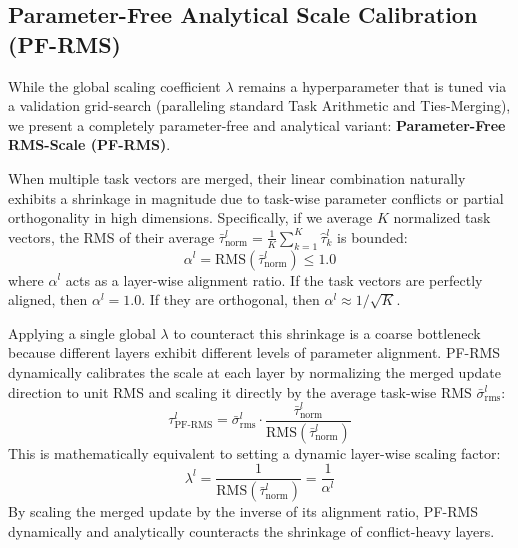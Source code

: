 \subsection{Parameter-Free Analytical Scale Calibration (PF-RMS)}
While the global scaling coefficient $\lambda$ remains a hyperparameter that is tuned via a validation grid-search (paralleling standard Task Arithmetic and Ties-Merging), we present a completely parameter-free and analytical variant: \textbf{Parameter-Free RMS-Scale (PF-RMS)}.

When multiple task vectors are merged, their linear combination naturally exhibits a shrinkage in magnitude due to task-wise parameter conflicts or partial orthogonality in high dimensions. Specifically, if we average $K$ normalized task vectors, the RMS of their average $\bar{\tau}_{\text{norm}}^l = \frac{1}{K} \sum_{k=1}^K \hat{\tau}_k^l$ is bounded:
\begin{equation}
\alpha^l = \text{RMS}(\bar{\tau}_{\text{norm}}^l) \le 1.0
\end{equation}
where $\alpha^l$ acts as a layer-wise alignment ratio. If the task vectors are perfectly aligned, then $\alpha^l = 1.0$. If they are orthogonal, then $\alpha^l \approx 1/\sqrt{K}$.

Applying a single global $\lambda$ to counteract this shrinkage is a coarse bottleneck because different layers exhibit different levels of parameter alignment. PF-RMS dynamically calibrates the scale at each layer by normalizing the merged update direction to unit RMS and scaling it directly by the average task-wise RMS $\bar{\sigma}_{\text{rms}}^l$:
\begin{equation}
\tau_{\text{PF-RMS}}^l = \bar{\sigma}_{\text{rms}}^l \cdot \frac{\bar{\tau}_{\text{norm}}^l}{\text{RMS}(\bar{\tau}_{\text{norm}}^l)}
\end{equation}
This is mathematically equivalent to setting a dynamic layer-wise scaling factor:
\begin{equation}
\lambda^l = \frac{1}{\text{RMS}(\bar{\tau}_{\text{norm}}^l)} = \frac{1}{\alpha^l}
\end{equation}
By scaling the merged update by the inverse of its alignment ratio, PF-RMS dynamically and analytically counteracts the shrinkage of conflict-heavy layers. 

